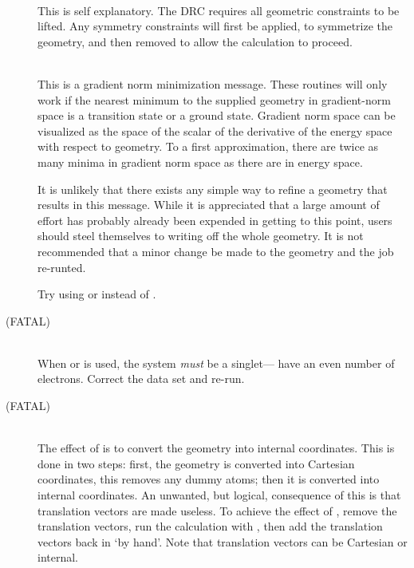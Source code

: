 \begin{description}
\item[]~\\
This  is  self  explanatory.   The  DRC  requires   all   geometric
constraints  to  be  lifted.   Any  symmetry  constraints  will first be
applied, to symmetrize the geometry,  and  then  removed  to  allow  the
calculation to proceed.

\item[]~\\
This is a gradient norm minimization message.  These routines  will only  
work   if  the  nearest  minimum  to  the  supplied  geometry  in gradient-norm
space is a transition state or a ground  state.   Gradient norm  space  can 
be  visualized  as  the  space  of  the  scalar of the derivative of the energy
space with respect to  geometry.   To  a  first approximation,  there are twice
as many minima in gradient norm space as there are in energy space.

It is unlikely that  there  exists  any  simple  way  to  refine  a geometry 
that  results in this message.  While it is appreciated that a large amount of
effort has probably already been expended in getting  to this  point,  users 
should  steel  themselves  to writing off the whole geometry.  It is not
recommended that a minor  change  be  made  to  the geometry and the job
re-runted. %

Try using  or  instead of .
                                                  
\item[ (FATAL)]~\\
When  or  is used, the system {\em must} be a
singlet--- have an even number of electrons.  Correct the data set
and re-run.

\item[ (FATAL)]~\\
The effect of  is to convert the geometry into internal coordinates. 
This is done in two steps: first, the geometry is converted into Cartesian
coordinates,  this removes any dummy atoms; then it is converted into internal
coordinates. An unwanted, but logical, consequence of this is that translation
vectors are made useless.  To achieve the effect of , remove the
translation vectors, run the calculation with , then add the
translation vectors back in  `by hand'.  Note that translation vectors can be
Cartesian or internal.



\end{description}
